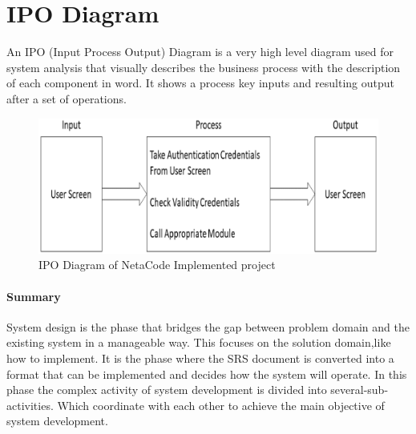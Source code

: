 \documentclass[a4paper,12pt]{report}
\begin{document}
\section{IPO Diagram}
An IPO (Input Process Output) Diagram is a very high level diagram used for system analysis that visually describes the business process with the description of each component in word. It shows a process key inputs and resulting output after a set of operations.
\begin{figure}
	\centering
	\includegraphics[width=0.7\linewidth]{9_4}
	\caption{IPO Diagram of NetaCode Implemented project}
	\label{fig:94}
\end{figure}
\paragraph{Summary}
System design is the phase that bridges the gap between problem domain and the existing system in a manageable way. This focuses on the solution domain,like how to implement. It is the phase where the SRS document is converted into a format that can be implemented and decides how the system will operate. In this phase the complex activity of system development is divided into several-sub-activities. Which coordinate with each other to achieve the main objective of system development.


	
\end{document}
